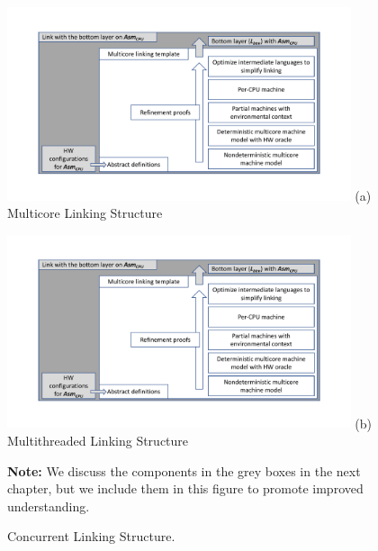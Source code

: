 \begin{figure}
\begin{center}
\includegraphics[width=0.9\textwidth, page=1]{figs/conlink/overview}\newline
(a) Multicore Linking Structure
\end{center}
\begin{center}
\includegraphics[width=0.9\textwidth, page=2]{figs/conlink/overview}\newline
(b) Multithreaded Linking Structure
\end{center}
\textbf{Note:} We discuss the components in the grey boxes in the next chapter, but we include them in this figure to promote improved understanding.
\caption{Concurrent Linking Structure.}
\label{fig:chapter:conlink:concurrent-linking-structure}
\end{figure}


